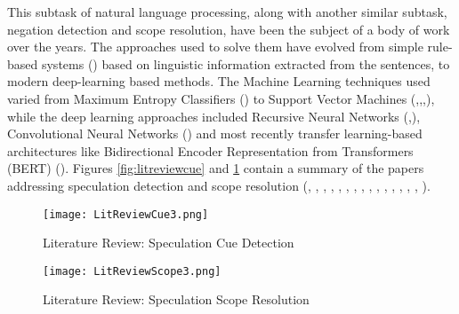\documentclass[runningheads]{llncs}
\begin{document}
\indent This subtask of natural language processing, along with another similar subtask, negation detection and scope resolution, have been the subject of a body of work over the years. The approaches used to solve them have evolved from simple rule-based systems (\cite{kilicoglu-bergler-2010-high}) based on linguistic information extracted from the sentences, to modern deep-learning based methods. The Machine Learning techniques used varied from Maximum Entropy Classifiers (\cite{velldal-etal-2010-resolving}) to Support Vector Machines (\cite{diaz-noa-taboada},\cite{ozgur-radev-2009-detecting},\cite{velldal},\cite{velldal-etal-2012-speculation}), while the deep learning approaches included Recursive Neural Networks (\cite{FEI202022},\cite{ren-yafeng}), Convolutional Neural Networks (\cite{qian-etal-2016-speculation}) and most recently transfer learning-based architectures like Bidirectional Encoder Representation from Transformers (BERT) (\cite{2019arXiv191104211K}). Figures \ref{fig:litreviewcue} and \ref{fig:litreviewscope} contain a summary of the papers addressing speculation detection and scope resolution  (\cite{apostolova-etal-2011-automatic}, \cite{diaz-noa-taboada}, \cite{FEI202022}, \cite{kilicoglu-bergler-2010-high}, \cite{moncecchi-etal-2012-improving}, \cite{morante-daelemans-2009-learning}, \cite{morante-etal-2010-memory}, \cite{ovrelid-etal-2010-syntactic}, \cite{ozgur-radev-2009-detecting}, \cite{qian-etal-2016-speculation}, \cite{read-jonathon-velldal}, \cite{ren-yafeng}, \cite{tang-etal-2010-cascade}, \cite{velldal},  \cite{velldal-etal-2010-resolving}, \cite{velldal-etal-2012-speculation}). \par

\begin{figure}[!htb]
    \centering
    \texttt{[image: LitReviewCue3.png]}
    \caption{Literature Review: Speculation Cue Detection}
    \label{fig:litreviewcue}

    \centering
    \texttt{[image: LitReviewScope3.png]}
    \caption{Literature Review: Speculation Scope Resolution}
    \label{fig:litreviewscope}
\end{figure}
\end{document}
